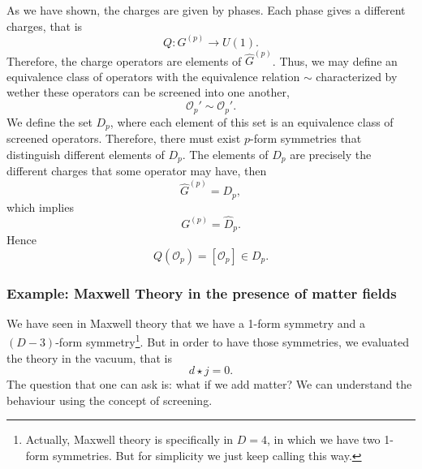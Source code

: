 \documentclass{article}
\begin{document}
As we have shown, the charges are given by phases. Each phase gives a different charges, that is 
\begin{equation}
	Q:G^{(p)}\to U(1).
\end{equation}
Therefore, the charge operators are elements of $\widehat{G}^{(p)}$. 
Thus, we may define an equivalence class of operators with the equivalence relation $\sim$ characterized by wether these operators can be screened into one another, 
\begin{equation*}
	\mathcal{O}_p'\sim \mathcal{O}_p'.
\end{equation*}
We define the set $D_p$, where each element of this set is an equivalence class of screened operators. Therefore, there must exist $p$-form symmetries that distinguish different elements of $D_p$. The elements of $D_p$ are precisely the different charges that some operator may have, then 
\begin{equation*}
	\widehat{G}^{(p)}=D_p,
\end{equation*}
which implies
\begin{equation*}
	G^{(p)}=\widehat{D}_p.
\end{equation*}
Hence 
\begin{equation}
	Q(\mathcal{O}_p)=[\mathcal{O}_p]\in D_p.
\end{equation}
\subsubsection*{Example: Maxwell Theory in the presence of matter fields}
We have seen in Maxwell theory that we have a 1-form symmetry and a $(D-3)$-form symmetry\footnote{Actually, Maxwell theory is specifically in $D=4$, in which we have two 1-form symmetries. But for simplicity we just keep calling this way.}. But in order to have those symmetries, we evaluated the theory in the vacuum, that is 
\begin{equation*}
	d\star j=0.
\end{equation*}
The question that one can ask is: what if we add matter? We can understand the behaviour using the concept of screening. 
\end{document}
